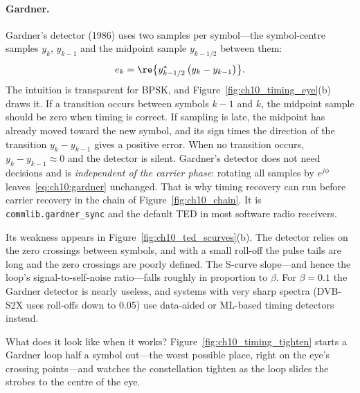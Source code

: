 \paragraph{Gardner.} Gardner's detector (1986) uses two samples per symbol---the symbol-centre
samples $y_k$, $y_{k-1}$ and the midpoint sample $y_{k-1/2}$ between them:
\begin{equation}
e_k=\re\bigl\{y_{k-1/2}^*\,\bigl(y_k-y_{k-1}\bigr)\bigr\}.
\label{eq:ch10:gardner}
\end{equation}
The intuition is transparent for BPSK, and Figure~\ref{fig:ch10_timing_eye}(b) draws it. If a
transition occurs between symbols $k-1$ and $k$, the midpoint sample should be zero when timing is
correct. If sampling is late, the midpoint has already moved toward the new symbol, and its sign
times the direction of the transition $y_k-y_{k-1}$ gives a positive error. When no transition
occurs, $y_k-y_{k-1}\approx0$ and the detector is silent. Gardner's detector does not need decisions
and is \emph{independent of the carrier phase}: rotating all samples by $e^{j\phi}$
leaves~\eqref{eq:ch10:gardner} unchanged. That is why timing recovery can run before carrier
recovery in the chain of Figure~\ref{fig:ch10_chain}. It is \texttt{commlib.gardner\_sync} and the
default TED in most software radio receivers.

Its weakness appears in Figure~\ref{fig:ch10_ted_scurves}(b). The detector relies on the zero crossings
between symbols, and with a small roll-off the pulse tails are long and the zero crossings are
poorly defined. The S-curve slope---and hence the loop's signal-to-self-noise ratio---falls roughly in
proportion to $\beta$. For $\beta=0.1$ the Gardner detector is nearly useless, and systems with very
sharp spectra (DVB-S2X uses roll-offs down to 0.05) use data-aided or ML-based timing detectors
instead.


What does it look like when it works? Figure~\ref{fig:ch10_timing_tighten} starts a Gardner loop
half a symbol out---the worst possible place, right on the eye's crossing points---and watches the
constellation tighten as the loop slides the strobes to the centre of the eye.

